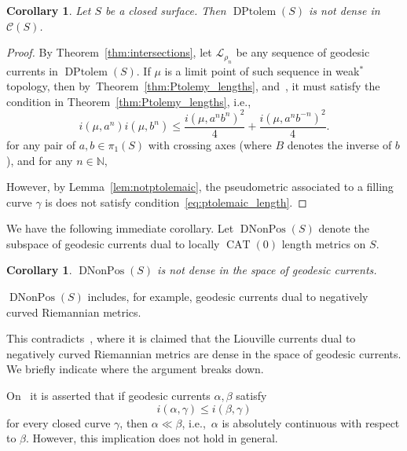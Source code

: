\documentclass[12pt]{amsart}
\newcommand*{\svgfignormal}[1]{\fontsize{9pt}{8pt}\selectfont}
\numberwithin{equation}{section}
\numberwithin{figure}{section}
\newtheorem{corollary}[equation]{Corollary}
\theoremstyle{definition}
\theoremstyle{plain}
\newcommand\C{\mathcal{C}}
\DeclareMathOperator{\CAT}{CAT}
\DeclareMathOperator{\DNonPos}{DNonPos}
\begin{document}
\begin{corollary}
Let $S$ be a closed surface.  Then $\operatorname{DPtolem}(S)$ is not dense in $\C(S)$.
\label{cor:notdense}
\end{corollary}
\begin{proof}
By Theorem~\ref{thm:intersections}, let $\mathcal{L}_{\rho_n}$ be any sequence of geodesic currents in $\operatorname{DPtolem}(S)$. If $\mu$ is a limit point of such sequence in weak$^*$ topology, then by~Theorem~\ref{thm:Ptolemy_lengths}, and~\cite[Th\'eor\`eme~2]{Otal90:SpectreMarqueNegative}, it must satisfy the condition in Theorem~\ref{thm:Ptolemy_lengths}, i.e., 
\begin{equation}
i(\mu, a^n) i(\mu,b^n) \leq \frac{i(\mu,a^nb^n)^2}{4} +  \frac{i(\mu,a^nb^{-n})^2}{4}.
\label{eq:ptolemaic_length}
\end{equation}
for any pair of $a, b \in \pi_1(S)$ with crossing axes (where $B$ denotes the inverse of $b$), and for any $n \in \mathbb{N}$,


    \begin{figure}[h]
\svgfignormal{filling}
    \caption{ }\label{fig:filling}
\end{figure}

However, by Lemma~\ref{lem:notptolemaic}, the pseudometric associated to a filling curve $\gamma$ is does not satisfy condition~\eqref{eq:ptolemaic_length}.
\end{proof}

We have the following immediate corollary.
Let $\DNonPos(S)$ denote the subspace of geodesic currents dual to locally $\CAT(0)$ length metrics on $S$.

\begin{corollary}
$\DNonPos(S)$ is not dense in the space of geodesic currents.
\label{cor:neg_notdense}
\end{corollary}

$\DNonPos(S)$ includes, for example, geodesic currents dual to negatively curved 
Riemannian metrics.

This contradicts~\cite[Lemma~2.8]{Ham99:Cocycles}, where it is claimed that the Liouville currents dual to negatively curved Riemannian metrics are dense in the space of geodesic currents.
We briefly indicate where the argument breaks down.

On~\cite[Page~108]{Ham99:Cocycles} it is asserted that if geodesic currents $\alpha,\beta$ satisfy
\[
i(\alpha,\gamma)\le i(\beta,\gamma)
\]
for every closed curve $\gamma$, then $\alpha \ll \beta$, i.e.,\ $\alpha$ is absolutely continuous with respect to $\beta$.
However, this implication does not hold in general.
\end{document}
